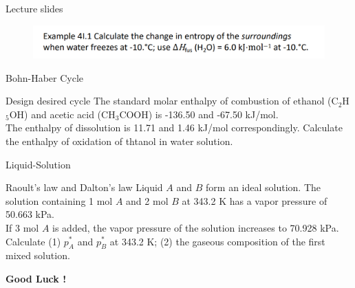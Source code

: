 \documentclass[12pt,compress]{beamer}
\begin{document}
\begin{frame}{Lecture slides}
    \begin{figure}[H]
        \centering
        \includegraphics[width=\textwidth]{S_sur.png}
    \end{figure}
\end{frame}



\begin{frame}{Bohn-Haber Cycle}
    \begin{block}{Design desired cycle}
        The standard molar enthalpy of combustion of ethanol (C$_2$H$_5$OH) and acetic acid (CH$_3$COOH) is -136.50 and -67.50 kJ/mol. \\
        The enthalpy of dissolution is 11.71 and 1.46 kJ/mol correspondingly. Calculate the enthalpy of oxidation of thtanol in water solution.
    \end{block}
\end{frame}
\begin{frame}{Liquid-Solution}
    \begin{block}{Raoult's law and Dalton's law}
        Liquid $A$ and $B$ form an ideal solution. The solution containing 1 mol $A$ and 2 mol $B$ at 343.2 K has a vapor pressure of 50.663 kPa. \\
        If 3 mol $A$ is added, the vapor pressure of the solution increases to 70.928 kPa. Calculate (1) $p_A^*$ and $p_B^*$ at 343.2 K; (2) the gaseous composition of the first mixed solution.
    \end{block}
\end{frame}


\begin{frame}{}
    \textbf{{\Huge{Good Luck !}}}
\end{frame}
\end{document}
